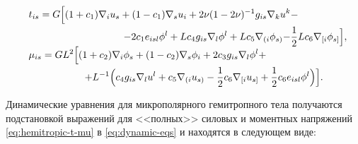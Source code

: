 \begin{equation}

\!\!\!

\begin{array}{l}

\begin{aligned}

t_{is}=G\Bigl[(1+c_1)\nabla_iu_s+(1-c_1)\nabla_su_i+2\nu(1-2\nu)^{-1}g_{is}\nabla_ku^k&-\\

-2c_1e_{isl}\phi^l+Lc_4g_{is}\nabla_l\phi^l+Lc_5\nabla_{(i}\phi_{s)}- &\frac{1}{2}Lc_6\nabla_{[i}\phi_{s]}\Bigr],

\end{aligned}\\

%

\begin{aligned}

\mu_{is}=GL^2\Bigl[(1+c_2)\nabla_i\phi_s+(1-c_2)\nabla_s\phi_i+2c_3g_{is}\nabla_l\phi^l&+\\

+L^{-1}\Bigl(c_4g_{is}\nabla_lu^l+c_5\nabla_{(i}u_{s)}-\frac{1}{2}c_6\nabla_{[i}u_{s]}&+\frac{1}{2}c_6e_{isl}\phi^l\Bigr)\Bigr].

\end{aligned}

\end{array}\!\!\!\!\!\!\!\!

\label{eq:hemitropic-t-mu}

\end{equation}



Динамические уравнения для микрополярного гемитропного тела получаются подстановкой выражений для  <<полных>> силовых и моментных напряжений \eqref{eq:hemitropic-t-mu} в \eqref{eq:dynamic-eqs} и находятся в следующем виде:

